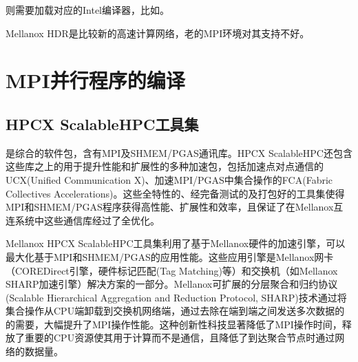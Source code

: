 \documentclass[a4paper,12pt,english]{sphinxmanual}
\begin{document}
\sphinxAtStartPar
则需要加载对应的Intel编译器，比如。

\sphinxAtStartPar
Mellanox HDR是比较新的高速计算网络，老的MPI环境对其支持不好。


\section{MPI并行程序的编译}
\label{\detokenize{mpi-application/mpi-application:id2}}

\subsection{HPC\sphinxhyphen{}X ScalableHPC工具集}
\label{\detokenize{mpi-application/mpi-application:hpc-x-scalablehpc}}
\sphinxAtStartPar
{}是综合的软件包，含有MPI及SHMEM/PGAS通讯库。HPC\sphinxhyphen{}X ScalableHPC还包含这些库之上的用于提升性能和扩展性的多种加速包，包括加速点对点通信的UCX(Unified Communication X)、加速MPI/PGAS中集合操作的FCA(Fabric Collectives Accelerations)。这些全特性的、经完备测试的及打包好的工具集使得MPI和SHMEM/PGAS程序获得高性能、扩展性和效率，且保证了在Mellanox互连系统中这些通信库经过了全优化。

\sphinxAtStartPar
Mellanox HPC\sphinxhyphen{}X ScalableHPC工具集利用了基于Mellanox硬件的加速引擎，可以最大化基于MPI和SHMEM/PGAS的应用性能。这些应用引擎是Mellanox网卡（CORE\sphinxhyphen{}Direct引擎，硬件标记匹配(Tag Matching)等）和交换机（如Mellanox SHARP加速引擎）解决方案的一部分。Mellanox可扩展的分层聚合和归约协议(Scalable Hierarchical Aggregation and Reduction Protocol, SHARP)技术通过将集合操作从CPU端卸载到交换机网络端，通过去除在端到端之间发送多次数据的的需要，大幅提升了MPI操作性能。这种创新性科技显著降低了MPI操作时间，释放了重要的CPU资源使其用于计算而不是通信，且降低了到达聚合节点时通过网络的数据量。
\end{document}
